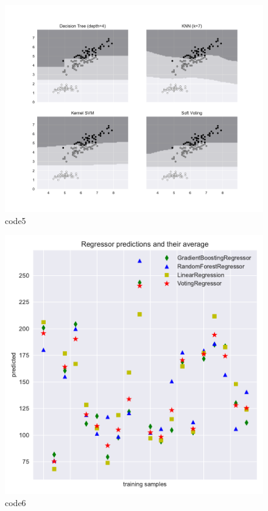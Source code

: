 \begin{PythonCode}\label{例5}
	
\end{PythonCode}

\begin{figure}[htbp]
	\centering
	\includegraphics[width=14cm]{codeimage/code5}
	\caption{code5}
	\label{code5}
\end{figure}

\begin{PythonCode}\label{例6}
	
\end{PythonCode}

\begin{figure}[htbp]
	\centering
	\includegraphics[width=14cm]{codeimage/code6}
	\caption{code6}
	\label{code6}
\end{figure}
